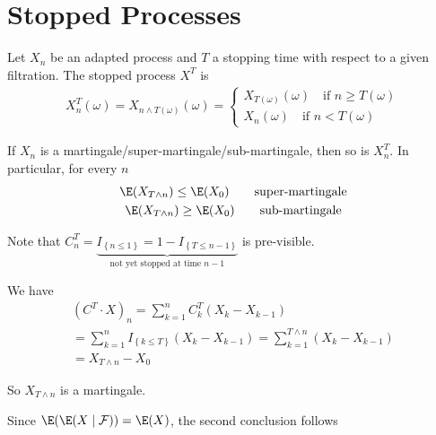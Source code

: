 \section{Stopped Processes}
Let $X_n$ be an adapted process and $T$ a stopping time with respect to a given filtration. The stopped process $X^T$ is
\begin{equation*}
  \begin{gathered}
    X_n^T(\omega) = X_{n\wedge T(\omega)}(\omega) = \begin{cases}X_{T(\omega)}(\omega)\quad\text{if } n\geq T(\omega)\\X_n(\omega)\quad\text{if } n<T(\omega)\end{cases}
  \end{gathered}
\end{equation*}
\par\bigskip
\begin{theo}[]{}
  If $X_n$ is a martingale/super-martingale/sub-martingale, then so is $X_n^T$. In particular, for every $n$
  \begin{equation*}
    \begin{gathered}
      \E(X_{T\wedge n})\leq \E(X_0)\qquad\text{super-martingale}\\
      \E(X_{T\wedge n})\geq \E(X_0)\qquad\text{sub-martingale}
    \end{gathered}
  \end{equation*}
\end{theo}
\par\bigskip
\begin{prf}[]{}
  Note that $C_n^T=\underbrace{I_{\left\{n\leq 1\right\}} = 1-I_{\left\{T\leq n-1\right\}}}_{\text{not yet stopped at time $n-1$}}$ is pre-visible.\par
  \noindent We have 
  \begin{equation*}
    \begin{gathered}
      (C^T\cdot X)_n = \sum_{k=1}^{n}C_k^T(X_k-X_{k-1})\\
      = \sum_{k=1}^{n}I_{\left\{k\leq T\right\}}(X_k-X_{k-1}) = \sum_{k=1}^{T\wedge n}(X_k-X_{k-1})\\
      = X_{T\wedge n} -X_0
    \end{gathered}
  \end{equation*}\par
  \noindent So $X_{T\wedge n}$ is a martingale.\par
  \noindent Since $\E(\E(X\mid\mathcal{F})) = \E(X)$, the second conclusion follows
\end{prf}
